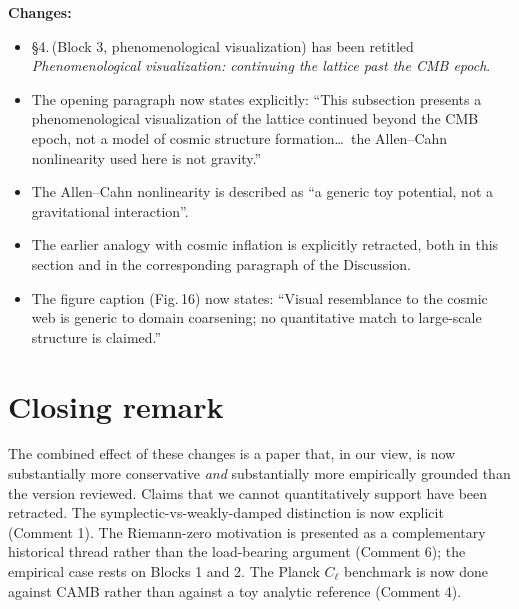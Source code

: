 \documentclass[12pt,a4paper]{article}
\begin{document}
\textbf{Changes:}
\begin{itemize}[leftmargin=2em]
  \item §4.\,(Block 3, phenomenological visualization) has been retitled \textit{Phenomenological visualization: continuing the lattice past the CMB epoch}.
  \item The opening paragraph now states explicitly: ``This subsection presents a phenomenological visualization of the lattice continued beyond the CMB epoch, not a model of cosmic structure formation\ldots\ the Allen--Cahn nonlinearity used here is not gravity.''
  \item The Allen--Cahn nonlinearity is described as ``a generic toy potential, not a gravitational interaction''.
  \item The earlier analogy with cosmic inflation is explicitly retracted, both in this section and in the corresponding paragraph of the Discussion.
  \item The figure caption (Fig.\,16) now states: ``Visual resemblance to the cosmic web is generic to domain coarsening; no quantitative match to large-scale structure is claimed.''
\end{itemize}

\section*{Closing remark}

The combined effect of these changes is a paper that, in our view, is now substantially more conservative \emph{and} substantially more empirically grounded than the version reviewed.
Claims that we cannot quantitatively support have been retracted.
The symplectic-vs-weakly-damped distinction is now explicit (Comment 1).
The Riemann-zero motivation is presented as a complementary historical thread rather than the load-bearing argument (Comment 6); the empirical case rests on Blocks 1 and 2.
The Planck $C_\ell$ benchmark is now done against CAMB rather than against a toy analytic reference (Comment 4).
\end{document}
